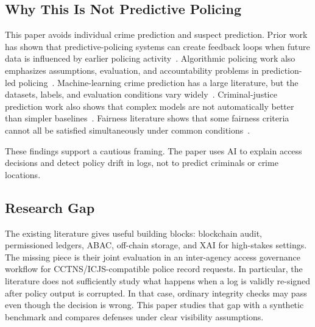 \subsection{Why This Is Not Predictive Policing}

This paper avoids individual crime prediction and suspect prediction. Prior
work has shown that predictive-policing systems can create feedback loops when
future data is influenced by earlier policing activity~\cite{ensign_feedback_2018}.
Algorithmic policing work also emphasizes assumptions, evaluation, and
accountability problems in prediction-led policing~\cite{bennett_moses_policing_2018}.
Machine-learning crime prediction has a large literature, but the datasets,
labels, and evaluation conditions vary widely~\cite{jenga_crime_prediction_2023}.
Criminal-justice prediction work also shows that complex models are not
automatically better than simpler baselines~\cite{dressel_fairness_limits_2018}.
Fairness literature shows that some fairness criteria cannot all be satisfied
simultaneously under common conditions~\cite{chouldechova_2017,kleinberg_tradeoffs_2016}.

These findings support a cautious framing. The paper uses AI to explain access
decisions and detect policy drift in logs, not to predict criminals or crime
locations.

\subsection{Research Gap}

The existing literature gives useful building blocks: blockchain audit,
permissioned ledgers, ABAC, off-chain storage, and XAI for high-stakes
settings. The missing piece is their joint evaluation in an inter-agency access
governance workflow for CCTNS/ICJS-compatible police record requests. In particular,
the literature does not sufficiently study what happens when a log is validly
re-signed after policy output is corrupted. In that case, ordinary integrity
checks may pass even though the decision is wrong. This paper studies that gap
with a synthetic benchmark and compares defenses under clear visibility
assumptions.

